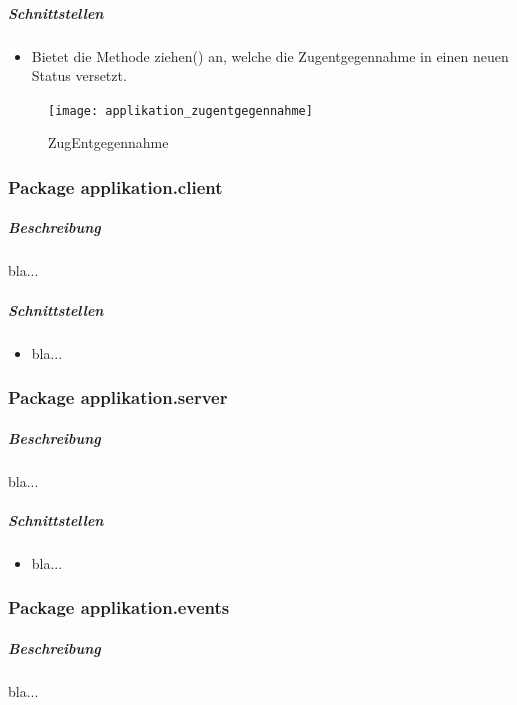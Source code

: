 \documentclass[12pt,halfparskip]{scrartcl}
\begin{document}
\subparagraph{Schnittstellen} %
\label{ssub:schnittstellen}
\begin{itemize}
	\item Bietet die Methode ziehen() an, welche die Zugentgegennahme in einen neuen Status versetzt.
\end{itemize}

\begin{figure}[h]
	\centering
	\texttt{[image: applikation\_zugentgegennahme]}
	\caption{ZugEntgegennahme}
	\label{fig:applikation_zugentgegennahme}
\end{figure}


\clearpage
\subsubsection{Package applikation.client}
\label{ssub:package_applikation_client} %
\subparagraph{Beschreibung}
\label{ssub:beschreibung}
bla...

\subparagraph{Schnittstellen}
\label{ssub:schnittstellen}
\begin{itemize}
	\item bla...
\end{itemize}

\clearpage
\subsubsection{Package applikation.server}
\label{ssub:package_applikation_server} %
\subparagraph{Beschreibung}
\label{ssub:beschreibung}
bla...

\subparagraph{Schnittstellen}
\label{ssub:schnittstellen}
\begin{itemize}
	\item bla...
\end{itemize}

\clearpage
\subsubsection{Package applikation.events}
\label{ssub:package_applikation_events} %
\subparagraph{Beschreibung}
\label{ssub:beschreibung}
bla...
\end{document}
